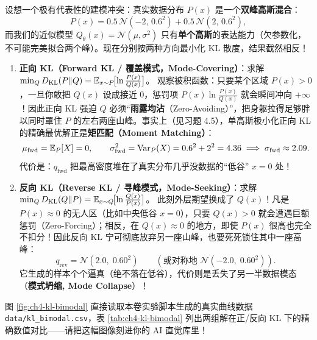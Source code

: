 设想一个极有代表性的建模冲突：真实数据分布 $P(x)$ 是一个\textbf{双峰高斯混合}：
\[
  P(x) = 0.5\,\mathcal{N}(-2,\, 0.6^2) + 0.5\,\mathcal{N}(2,\, 0.6^2),
\]
而我们的近似模型 $Q_\theta(x) = \mathcal{N}(\mu, \sigma^2)$ 只有\textbf{单个高斯}的表达能力（欠参数化，不可能完美拟合两个峰）。现在分别按两种方向最小化 KL 散度，结果截然相反！

\begin{enumerate}
  \item \textbf{正向 KL（Forward KL / 覆盖模式，Mode-Covering）}：求解 $\min_Q D_{\mathrm{KL}}(P \| Q) = \mathbb{E}_{x\sim P}\!\bigl[\ln\frac{P(x)}{Q(x)}\bigr]$。
  观察被积函数：只要某个区域 $P(x) > 0$，一旦你敢把 $Q(x)$ 设成接近 $0$，惩罚项 $P(x)\ln\frac{P(x)}{Q(x)}$ 就会瞬间冲向 $+\infty$！因此正向 KL 强迫 $Q$ 必须“\textbf{雨露均沾}（Zero-Avoiding）”，把身躯拉得足够胖以同时罩住 $P$ 的左右两座山峰。事实上（见习题 4.5），单高斯极小化正向 KL 的精确最优解正是\textbf{矩匹配（Moment Matching）}：
  \[
    \mu_{\mathrm{fwd}} = \mathbb{E}_P[X] = 0,
    \qquad
    \sigma_{\mathrm{fwd}}^2 = \operatorname{Var}_P(X) = 0.6^2 + 2^2 = 4.36 \implies \sigma_{\mathrm{fwd}} \approx 2.09.
  \]
  代价是：$q_{\mathrm{fwd}}$ 把最高密度堆在了真实分布几乎没数据的“低谷” $x = 0$ 处！

  \item \textbf{反向 KL（Reverse KL / 寻峰模式，Mode-Seeking）}：求解 $\min_Q D_{\mathrm{KL}}(Q \| P) = \mathbb{E}_{x\sim Q}\!\bigl[\ln\frac{Q(x)}{P(x)}\bigr]$。
  此刻外层期望换成了 $Q(x)$！凡是 $P(x) \approx 0$ 的无人区（比如中央低谷 $x = 0$），只要 $Q(x) > 0$ 就会遭遇巨额惩罚（Zero-Forcing）；相反，在 $Q(x) \approx 0$ 的地方，即使 $P(x)$ 很高也完全不扣分！因此反向 KL 宁可彻底放弃另一座山峰，也要死死锁住其中一座高峰：
  \[
    q_{\mathrm{rev}} = \mathcal{N}(2.0,\; 0.60^2) \qquad (\text{或对称地 }\mathcal{N}(-2.0,\; 0.60^2)).
  \]
  它生成的样本个个逼真（绝不落在低谷），代价则是丢失了另一半数据模态（\textbf{模式坍缩, Mode Collapse}）！
\end{enumerate}

图 \ref{fig:ch4-kl-bimodal} 直接读取本卷实验脚本生成的真实曲线数据 \texttt{data/kl\_bimodal.csv}，表 \ref{tab:ch4-kl-bimodal} 列出两组解在正/反向 KL 下的精确数值对比——请把这幅图像刻进你的 AI 直觉库里！

